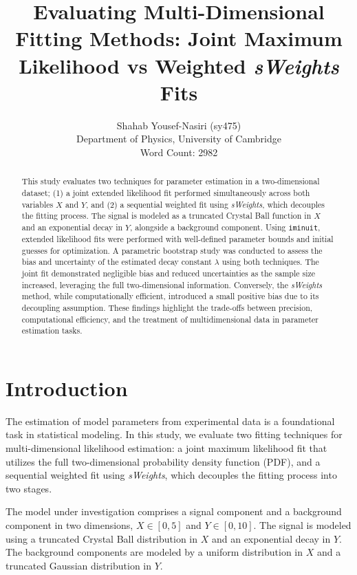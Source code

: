 \documentclass[11pt, a4paper]{article}
\title{\textbf{Evaluating Multi-Dimensional Fitting Methods: Joint Maximum Likelihood vs Weighted \textit{sWeights} Fits}}
\author{
    Shahab Yousef-Nasiri (sy475) \\
    \small Department of Physics, University of Cambridge \\
    \small Word Count: 2982
}
\date{}
\begin{document}
\maketitle

\begin{abstract}
This study evaluates two techniques for parameter estimation in a two-dimensional dataset; (1) a joint extended likelihood fit performed simultaneously across both variables \( X \) and \( Y \), and (2) a sequential weighted fit using \textit{sWeights}, which decouples the fitting process. The signal is modeled as a truncated Crystal Ball function in \( X \) and an exponential decay in \( Y \), alongside a background component. Using \texttt{iminuit}, extended likelihood fits were performed with well-defined parameter bounds and initial guesses for optimization. A parametric bootstrap study was conducted to assess the bias and uncertainty of the estimated decay constant \( \lambda \) using both techniques. The joint fit demonstrated negligible bias and reduced uncertainties as the sample size increased, leveraging the full two-dimensional information. Conversely, the \textit{sWeights} method, while computationally efficient, introduced a small positive bias due to its decoupling assumption. These findings highlight the trade-offs between precision, computational efficiency, and the treatment of multidimensional data in parameter estimation tasks.  
\end{abstract}

\newpage
\tableofcontents
\newpage
\section{Introduction}

The estimation of model parameters from experimental data is a foundational task in statistical modeling. In this study, we evaluate two fitting techniques for multi-dimensional likelihood estimation: a joint maximum likelihood fit that utilizes the full two-dimensional probability density function (PDF), and a sequential weighted fit using \textit{sWeights}, which decouples the fitting process into two stages. 

The model under investigation comprises a signal component and a background component in two dimensions, \( X \in [0, 5] \) and \( Y \in [0, 10] \). The signal is modeled using a truncated Crystal Ball distribution in \( X \) and an exponential decay in \( Y \). The background components are modeled by a uniform distribution in \( X \) and a truncated Gaussian distribution in \( Y \).
\end{document}
